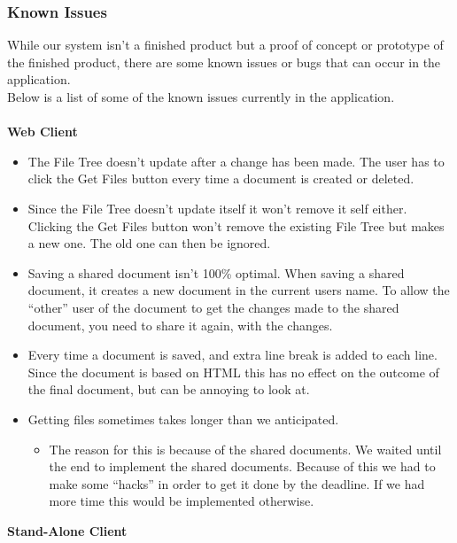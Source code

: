 \documentclass[11pt]{article}
\begin{document}
\subsubsection{Known Issues}
\label{sec-4-1-8}
While our system isn't a finished product but a proof of concept or prototype of the finished product, there are some known issues or bugs that can occur in the application. \\
Below is a list of some of the known issues currently in the application. \\ ~\\
\textbf{Web Client} 
\begin{itemize}
\item The File Tree doesn't update after a change has been made. The user has to click the 
     Get Files button every time a document is created or deleted.
\item Since the File Tree doesn't update itself it won't remove it self either. Clicking
     the Get Files button won't remove the existing File Tree but makes a new one. 
     The old one can then be ignored.
\item Saving a shared document isn't 100\% optimal. 
     When saving a shared document, it creates a new document in the current users 
     name. To allow the ``other'' user of the document to get the changes made to
     the shared document, you need to share it again, with the changes.
\item Every time a document is saved, and extra line break is added to each line. Since
     the document is based on HTML this has no effect on the outcome of the final 
     document, but can be annoying to look at.
\item Getting files sometimes takes longer than we anticipated.
\begin{itemize}
\item The reason for this is because of the shared documents. We waited until the end 
       to implement the shared documents. Because of this we had to make some ``hacks''
       in order to get it done by the deadline.
       If we had more time this would be implemented otherwise.
\end{itemize}
\end{itemize}
\textbf{Stand-Alone Client} 
\end{document}
